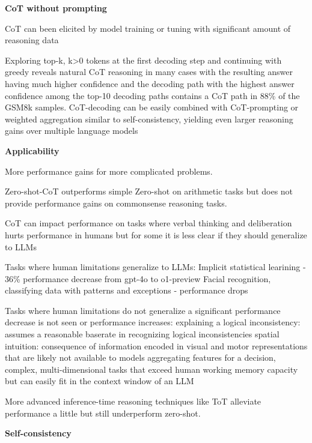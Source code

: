 \textbf{CoT without prompting}

CoT can been elicited by model training or tuning with significant amount of reasoning data \cite{wang2024chainofthoughtreasoningprompting}

Exploring top-k, k>0 tokens at the first decoding step and continuing with greedy reveals natural CoT reasoning in many cases 
with the resulting answer having much higher confidence and the decoding path with the highest answer confidence 
among the top-10 decoding paths contains a CoT path in 88\% of the GSM8k samples. CoT-decoding can be easily combined with 
CoT-prompting or weighted aggregation similar to self-consistency, yielding even larger reasoning gains over multiple language models \cite{wang2024chainofthoughtreasoningprompting}


\textbf{Applicability}

More performance gains for more complicated problems. \cite{wei2023chainofthoughtpromptingelicitsreasoning}

Zero-shot-CoT outperforms simple Zero-shot on arithmetic tasks but does not provide performance gains on commonsense reasoning tasks. \cite{NEURIPS2022_8bb0d291}

CoT can impact performance on tasks where verbal thinking and deliberation hurts performance in humans but for some
it is less clear if they should generalize to LLMs \cite{liu2024mindstepbystep}

Tasks where human limitations generalize to LLMs:
Implicit statistical learining - 36\% performance decrease from gpt-4o to o1-preview
Facial recognition, classifying data with patterns and exceptions - performance drops \cite{liu2024mindstepbystep}

Tasks where human limitations do not generalize a significant performance decrease is not seen or performance increases:
explaining a logical inconsistency:  assumes a reasonable baserate in recognizing logical inconsistencies
spatial intuition: consequence of information encoded in visual and motor representations that are likely not available to models 
aggregating features for a decision, complex, multi-dimensional tasks that exceed human working memory capacity but can easily fit in the context window of an LLM \cite{liu2024mindstepbystep}

More advanced inference-time reasoning techniques like ToT alleviate performance a little but still underperform zero-shot. \cite{liu2024mindstepbystep}

\textbf{Self-consistency}

